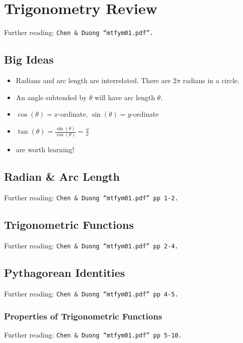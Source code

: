 \chapter{Trigonometry Review}
\label{chap:TR}
Further reading: \texttt{Chen \& Duong ``mtfym01.pdf''.}

\section{Big Ideas}
\label{sec:TR Big Ideas}
\begin{itemize}
  \item Radians and arc length are interrelated. There are $2\pi$ radians
  in a circle.
  \item An angle subtended by $\theta$ will have arc length $\theta$.
  \item $\cos(\theta) = x$-ordinate, $\sin(\theta) = y$-ordinate
  \item $\tan(\theta) = \frac{\sin(\theta)}{\cos(\theta)} = \frac{y}{x}$
  \item {} are worth learning!
\end{itemize}

\section{Radian \& Arc Length}
\label{sec:TR Radian and Arc Length}
Further reading: \texttt{Chen \& Duong ``mtfym01.pdf'' pp 1-2.}

\section{Trigonometric Functions}
\label{sec:TR Trigonometric Functions}
Further reading: \texttt{Chen \& Duong ``mtfym01.pdf'' pp 2-4.}

\section{Pythagorean Identities}
\label{sec:TR Pythagorean Identities}
Further reading: \texttt{Chen \& Duong ``mtfym01.pdf'' pp 4-5.}

\subsection{Properties of Trigonometric Functions}
\label{subsec:TR Trigonometric Functions - Properties}
Further reading: \texttt{Chen \& Duong ``mtfym01.pdf'' pp 5-10.}

